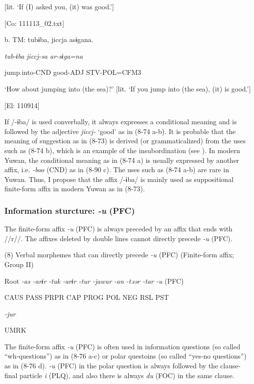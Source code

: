 [lit. ‘If (I) asked you, (it) was good.’]

      [Co: 111113\_02.txt]

  b.  TM:  tubɨba,  jiccja  asɨgana.

      \textit{tub-ɨba}  \textit{jiccj{}-sa  ar-sɨga=na}

      jump.into-CND  good-ADJ  STV-POL=CFM3

      ‘How about jumping into (the sea)?’ [lit. ‘If you jump into (the sea), (it) is good.’]

      [El: 110914]

If /-ɨba/ is used converbally, it always expresses a conditional meaning and is followed by the adjective \textit{jiccj-} ‘good’ as in (8-74 a-b). It is probable that the meaning of suggestion as in (8-73) is derived (or grammaticalized) from the uses such as (8-74 b), which is an example of the insubordination (see ). In modern Yuwan, the conditional meaning as in (8-74 a) is usually expressed by another affix, i.e. \textit{{}-boo} (CND) as in (8-90 c). The uses such as (8-74 a-b) are rare in Yuwan. Thus, I propose that the affix /-ɨba/ is mainly used as suppositional finite-form affix in modern Yuwan as in (8-73).

\subsubsection{Information sturcture: \textit{{}-u} (PFC)}

The finite-form affix \textit{{}-u} (PFC) is always preceded by an affix that ends with //r//. The affixes deleted by double lines cannot directly precede \textit{{}-u} (PFC).

(8)  Verbal morphemes that can directly precede \textit{{}-u} (PFC) (Finite-form affix; Group II)

  Root  \textit{{}-as  {}-arɨr} %
\textit{{}-tuk  {}-arɨr  {}-tur  {}-jawur} %
\textit{{}-an  {}-təər  {}-tar  {}-u} (PFC)

    CAUS  PASS  PRPR  CAP  PROG  POL  NEG  RSL  PST  

          \textit{{}-jur} 

          UMRK    

The finite-form affix \textit{{}-u} (PFC) is often used in information questions (so called “wh-questions”) as in (8-76 a-c) or polar questoins (so called “yes-no questions”) as in (8-76 d). \textit{{}-u} (PFC) in the polar question is always followed by the clause-final particle \textit{i} (PLQ), and also there is always \textit{du} (FOC) in the same clause.

